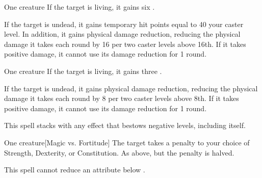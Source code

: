 \begin{spellheader}
    \spellrng{\rngclose}
    \spelldur{\durshort}
\end{spellheader}
\begin{spelleffects}
    \begin{spelltarget}{One creature}
        \spelleffect If the target is living, it gains six \negativelevels.

        \spelleffect If the target is undead, it gains temporary hit points equal to 40 \add your caster level. In addition, it gains physical damage reduction, reducing the physical damage it takes each round by 16  per two caster levels above 16th. If it takes positive damage, it cannot use its damage reduction for 1 round.
    \end{spelltarget}
\end{spelleffects}

\begin{spellheader}
    \spellrng{\rngclose}
    \spelldur{\durshort}
\end{spellheader}
\begin{spelleffects}
    \begin{spelltarget}{One creature}
        \spelleffect If the target is living, it gains three \negativelevels.

        If the target is undead, it gains physical damage reduction, reducing the physical damage it takes each round by 8  per two caster levels above 8th. If it takes positive damage, it cannot use its damage reduction for 1 round.
    \end{spelltarget}
\end{spelleffects}
\begin{spellfooter}
    \spellnotes This spell stacks with any effect that bestows negative levels, including itself.
\end{spellfooter}

\begin{spellheader}
    \spellrng{\rngmed}
    \spelldur{\durshort}
\end{spellheader}
\begin{spelleffects}
    \begin{spelltarget}{One creature}[Magic vs. Fortitude]
        \spellsuccess The target takes a  penalty to your choice of Strength, Dexterity, or Constitution.
        \spellfailure As above, but the penalty is halved.
    \end{spelltarget}
\end{spelleffects}
\begin{spellfooter}
    \spellnotes This spell cannot reduce an attribute below .
\end{spellfooter}

